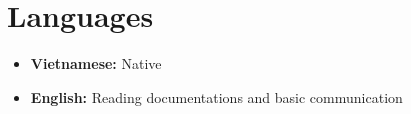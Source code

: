 \documentclass[a4paper,10pt]{article}
\begin{document}
\section{Languages}
\vspace{10pt}
\begin{itemize}[leftmargin=0.15in, label={}]
    \item \textbf{Vietnamese:} Native
    \item \textbf{English:} Reading documentations and basic communication
\end{itemize}
\end{document}

